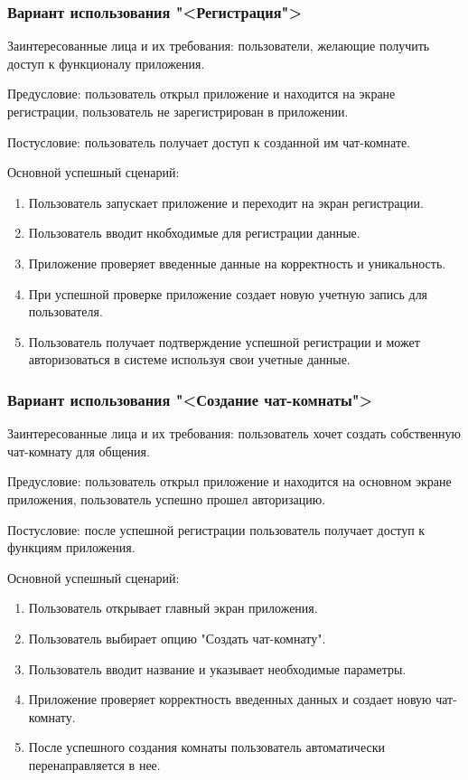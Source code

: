 \subsubsection{Вариант использования "<Регистрация">}

Заинтересованные лица и их требования: пользователи, желающие получить доступ к функционалу приложения.

Предусловие: пользователь открыл приложение и находится на экране регистрации, пользователь не зарегистрирован в приложении.

Постусловие: пользователь получает доступ к созданной им чат-комнате.

Основной успешный сценарий:

\begin{enumerate}
	\item Пользователь запускает приложение и переходит на экран регистрации.
	\item Пользователь вводит нкобходимые для регистрации данные.
	\item Приложение проверяет введенные данные на корректность и уникальность.
	\item При успешной проверке приложение создает новую учетную запись для пользователя.
	\item Пользователь получает подтверждение успешной регистрации и может авторизоваться в системе используя свои учетные данные.
\end{enumerate}

\subsubsection{Вариант использования "<Создание чат-комнаты">}

Заинтересованные лица и их требования: пользователь хочет создать собственную чат-комнату для общения.

Предусловие: пользователь открыл приложение и находится на основном экране приложения, пользователь успешно прошел авторизацию.

Постусловие: после успешной регистрации пользователь получает доступ к функциям приложения.

Основной успешный сценарий:

\begin{enumerate}
	\item Пользователь открывает главный экран приложения.
	\item Пользователь выбирает опцию "Создать чат-комнату".
	\item Пользователь вводит название и указывает необходимые параметры.
	\item Приложение проверяет корректность введенных данных и создает новую чат-комнату.
	\item После успешного создания комнаты пользователь автоматически перенаправляется в нее.
\end{enumerate}

